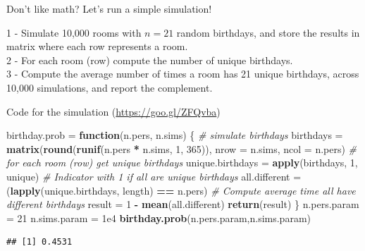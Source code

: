 \documentclass[ignorenonframetext,]{beamer}
\newenvironment{Shaded}{\begin{snugshade}}{\end{snugshade}}
\newcommand{\CommentTok}[1]{\textcolor[rgb]{0.56,0.35,0.01}{\textit{#1}}}
\newcommand{\ControlFlowTok}[1]{\textcolor[rgb]{0.13,0.29,0.53}{\textbf{#1}}}
\newcommand{\DataTypeTok}[1]{\textcolor[rgb]{0.13,0.29,0.53}{#1}}
\newcommand{\DecValTok}[1]{\textcolor[rgb]{0.00,0.00,0.81}{#1}}
\newcommand{\FloatTok}[1]{\textcolor[rgb]{0.00,0.00,0.81}{#1}}
\newcommand{\KeywordTok}[1]{\textcolor[rgb]{0.13,0.29,0.53}{\textbf{#1}}}
\newcommand{\NormalTok}[1]{#1}
\newcommand{\OperatorTok}[1]{\textcolor[rgb]{0.81,0.36,0.00}{\textbf{#1}}}
\newcommand{\StringTok}[1]{\textcolor[rgb]{0.31,0.60,0.02}{#1}}
\begin{document}
\begin{frame}{Don't like math? Let's run a simple simulation!}
\protect\hypertarget{dont-like-math-lets-run-a-simple-simulation}{}

1 - Simulate 10,000 rooms with \(n = 21\) random birthdays, and store
the results in matrix where each row represents a room.\\
2 - For each room (row) compute the number of unique birthdays.\\
3 - Compute the average number of times a room has 21 unique birthdays,
across 10,000 simulations, and report the complement.

\end{frame}

\begin{frame}[fragile]{Code for the simulation
(\url{https://goo.gl/ZFQvba})}
\protect\hypertarget{code-for-the-simulation-httpsgoo.glzfqvba}{}

\begin{Shaded}
\begin{Highlighting}[]
\NormalTok{birthday.prob =}\StringTok{ }\ControlFlowTok{function}\NormalTok{(n.pers, n.sims) \{}
  \CommentTok{# simulate birthdays}
\NormalTok{  birthdays =}\StringTok{ }\KeywordTok{matrix}\NormalTok{(}\KeywordTok{round}\NormalTok{(}\KeywordTok{runif}\NormalTok{(n.pers }\OperatorTok{*}\StringTok{ }\NormalTok{n.sims, }\DecValTok{1}\NormalTok{, }\DecValTok{365}\NormalTok{)), }
                      \DataTypeTok{nrow =}\NormalTok{ n.sims, }\DataTypeTok{ncol =}\NormalTok{ n.pers)}
  \CommentTok{# for each room (row) get unique birthdays}
\NormalTok{  unique.birthdays =}\StringTok{ }\KeywordTok{apply}\NormalTok{(birthdays, }\DecValTok{1}\NormalTok{, unique)}
  \CommentTok{# Indicator with 1 if all are unique birthdays}
\NormalTok{  all.different =}\StringTok{ }\NormalTok{(}\KeywordTok{lapply}\NormalTok{(unique.birthdays, length) }\OperatorTok{==}\StringTok{ }\NormalTok{n.pers)}
  \CommentTok{# Compute average time all have different birthdays }
\NormalTok{  result =}\StringTok{ }\DecValTok{1} \OperatorTok{-}\StringTok{ }\KeywordTok{mean}\NormalTok{(all.different)}
\KeywordTok{return}\NormalTok{(result)}
\NormalTok{\}}
\NormalTok{n.pers.param =}\StringTok{ }\DecValTok{21}
\NormalTok{n.sims.param =}\StringTok{ }\FloatTok{1e4}
\KeywordTok{birthday.prob}\NormalTok{(n.pers.param,n.sims.param)}
\end{Highlighting}
\end{Shaded}

\begin{verbatim}
## [1] 0.4531
\end{verbatim}

\end{frame}
\end{document}
